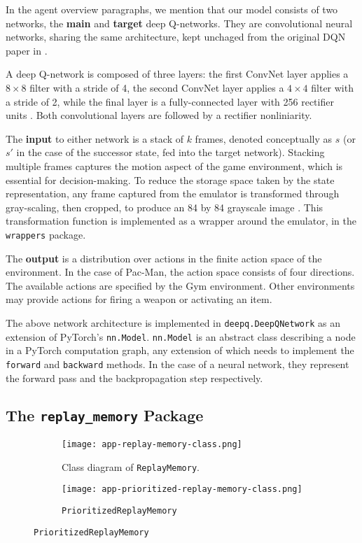 In the agent overview paragraphs, we mention that our model consists of two networks, the \textbf{main} and \textbf{target} deep Q-networks.
They are convolutional neural networks, sharing the same architecture, kept unchaged from the original DQN paper in \cite{atari-dqn}.

A deep Q-network is composed of three layers: the first ConvNet layer applies a $8 \times 8$ filter with a stride of 4, the second ConvNet layer applies a $4 \times 4$ filter with a stride of 2, while the final layer is a fully-connected layer with 256 rectifier units \cite{atari-dqn}.
Both convolutional layers are followed by a rectifier nonliniarity.

The \textbf{input} to either network is a stack of $k$ frames, denoted conceptually as $s$ (or $s'$ in the case of the successor state, fed into the target network).
Stacking multiple frames captures the motion aspect of the game environment, which is essential for decision-making.
To reduce the storage space taken by the state representation, any frame captured from the emulator is transformed through gray-scaling, then cropped, to produce an 84 by 84 grayscale image \cite{atari-dqn}.
This transformation function is implemented as a wrapper around the emulator, in the \texttt{wrappers} package.

The \textbf{output} is a distribution over actions in the finite action space of the environment.
In the case of Pac-Man, the action space consists of four directions.
The available actions are specified by the Gym environment.
Other environments may provide actions for firing a weapon or activating an item.

The above network architecture is implemented in \texttt{deepq.DeepQNetwork} as an extension of PyTorch’s \texttt{nn.Model}.
\texttt{nn.Model} is an abstract class describing a node in a PyTorch computation graph, any extension of which needs to implement the \texttt{forward} and \texttt{backward} methods.
In the case of a neural network, they represent the forward pass and the backpropagation step respectively.

\subsection{The \texttt{replay\_memory} Package} \label{section:replay-memory-implementation}

\begin{figure}[ht]
    \centering
    \begin{subfigure}[b]{0.5\textwidth}
        \centering
        \texttt{[image: app-replay-memory-class.png]}
        \caption{Class diagram of \texttt{ReplayMemory}.}
        \label{fig:rm-diagram}
    \end{subfigure}%
    \hfill
    \begin{subfigure}[b]{0.5\textwidth}
        \centering
        \texttt{[image: app-prioritized-replay-memory-class.png]}
        \caption{\texttt{PrioritizedReplayMemory}}
        \label{fig:prm-diagram}
    \end{subfigure}
\end{figure}

